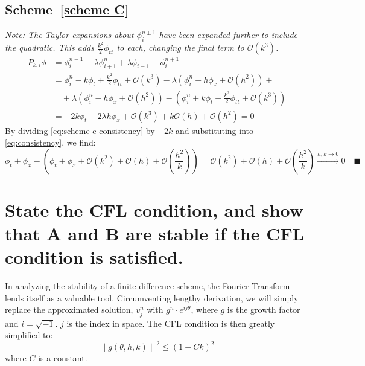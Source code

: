 \documentclass{math_hw}
\renewcommand\qedsymbol{\blacksquare}
\theoremstyle{definition}
\begin{document}
    \subsection*{Scheme~\ref{scheme C}}
    \textit{Note: The Taylor expansions about $\phi_i^{n\pm 1}$ have been expanded further to include the quadratic. This adds $\frac{k^2}{2}\phi_{tt}$ to each, changing the final term to $\mathcal{O}(k^3)$.}
    \begin{equation}
        \label{eq:scheme-c-consistency}
        \begin{split}
            P_{k,i}\phi &= \phi_i^{n-1}-\lambda\phi_{i+1}^n+\lambda\phi_{i-1}-\phi_i^{n+1}\\
            &=\phi_i^n-k\phi_t+\frac{k^2}{2}\phi_{tt}+\mathcal{O}(k^3)-\lambda\left( \phi_i^n+h\phi_x+\mathcal{O}(h^2) \right) +\\ &\quad + \lambda\left( \phi_i^n-h\phi_x+\mathcal{O}(h^2) \right) - \left( \phi_i^n+k\phi_t+\frac{k^2}{2}\phi_{tt}+\mathcal{O}(k^3) \right) \\
            &=-2k\phi_t-2\lambda h\phi_x+\mathcal{O}(k^3)+k\mathcal{O}(h)+\mathcal{O}(h^2)=0
        \end{split}
    \end{equation}
    By dividing \cref{eq:scheme-c-consistency} by $-2k$ and substituting into \cref{eq:consistency}, we find:
    \begin{equation*}
        \phi_t+\phi_x-\left( \phi_t+\phi_x+\mathcal{O}(k^2)+\mathcal{O}(h) +\mathcal{O}\left(\frac{h^2}{k}\right) \right) = \mathcal{O}(k^2)+\mathcal{O}(h)+\mathcal{O}\left(\frac{h^2}{k}\right)\xrightarrow{h,k\to 0} 0 \quad \qedsymbol
    \end{equation*}


    \section{{State the CFL condition, and show that \textbf{A} and \textbf{B} are stable if the CFL condition is satisfied.}} \label{sec:q2}
    In analyzing the stability of a finite-difference scheme, the Fourier Transform lends itself as a valuable tool.
    Circumventing lengthy derivation, we will simply replace the approximated solution, $v_j^n$ with $g^n \cdot e^{ij\theta}$, where $g$ is the growth factor and $i=\sqrt {-1}$. $j$ is the index in space.
    The CFL condition is then greatly simplified to:
    \begin{equation}
        \label{eq:cfl-condition}
        \left\| g(\theta,h,k) \right\|^2 \leq \left( 1+Ck \right)^2
    \end{equation}
    where $C$ is a constant.
\end{document}
